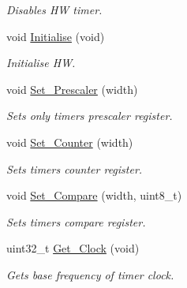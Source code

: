 \begin{DoxyCompactItemize}
\begin{DoxyCompactList}\small\item\em Disables HW timer. \end{DoxyCompactList}\item 
void \mbox{\hyperlink{class_pwm_a174796ea6d1f39c67753331ad9c93c6d}{Initialise}} (void)
\begin{DoxyCompactList}\small\item\em Initialise HW. \end{DoxyCompactList}\item 
void \mbox{\hyperlink{class_pwm_acfe533cd832faefcec2c86a473e4f130}{Set\+\_\+\+Prescaler}} (width)
\begin{DoxyCompactList}\small\item\em Sets only timer\textquotesingle{}s prescaler register. \end{DoxyCompactList}\item 
void \mbox{\hyperlink{class_pwm_aa258a3d3e68ac1294d13b0393cf9d168}{Set\+\_\+\+Counter}} (width)
\begin{DoxyCompactList}\small\item\em Sets timer\textquotesingle{}s counter register. \end{DoxyCompactList}\item 
void \mbox{\hyperlink{class_pwm_a10bd78a2a720708e59b73f18af51edc2}{Set\+\_\+\+Compare}} (width, uint8\+\_\+t)
\begin{DoxyCompactList}\small\item\em Sets timer\textquotesingle{}s compare register. \end{DoxyCompactList}\item 
uint32\+\_\+t \mbox{\hyperlink{class_pwm_aac8124330f23ecedd57c709f8834cb4a}{Get\+\_\+\+Clock}} (void)
\begin{DoxyCompactList}\small\item\em Gets base frequency of timer clock. \end{DoxyCompactList}\end{DoxyCompactItemize}
